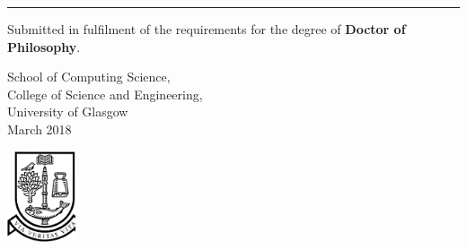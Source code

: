 
\begin{titlepage}

\relax

\begin{addmargin}[-1cm]{0cm}
\begin{flushleft}
\large

\hfill
\vfill

\begin{minipage}{12cm}
\begin{flushleft}
\textbf{\headingfont\fontsize{54}{100}\selectfont{Real-Time Event Detection using Twitter}}
\vspace{0.15cm}
\end{flushleft}
\end{minipage}

{\color{RoyalBlue}\noindent\rule{3cm}{1.75pt}}


\vspace{4cm}

\vfill

\noindent
\begin{minipage}{0.7\textwidth}
\begin{flushleft}

	Submitted in fulfilment of the requirements for the degree of \textbf{Doctor of Philosophy}.\\

	\vspace{1cm}

	School of Computing Science, \\
	College of Science and Engineering, \\
	University of Glasgow \\

	\bigskip
	\vfill
	\small{March 2018} %

\end{flushleft}
\end{minipage}
\hfill
\begin{minipage}{0.3\textwidth}

\begin{flushright}
\vspace{2cm}
\includegraphics[width=2cm]{Graphics/university-of-glasgow-logo.ps}
\end{flushright}
\end{minipage}

\end{flushleft}
\end{addmargin}

\end{titlepage}